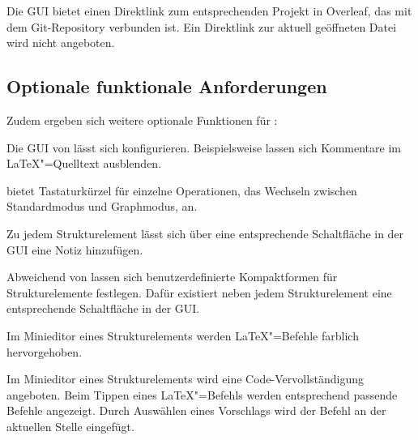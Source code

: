 
Die GUI bietet einen Direktlink zum entsprechenden Projekt in Overleaf, das mit dem Git-Repository verbunden ist.
Ein Direktlink zur aktuell geöffneten Datei wird nicht angeboten.

\clearpage

\subsection{Optionale funktionale Anforderungen}
\label{subsec:optionale-funktionale-anforderungen}

Zudem ergeben sich weitere optionale Funktionen für \texla:


Die GUI von \texla{} lässt sich konfigurieren.
Beispielsweise lassen sich Kommentare im \LaTeX"=Quelltext ausblenden.


\texla{} bietet Tastaturkürzel für einzelne Operationen, \zB{} das Wechseln zwischen Standardmodus und Graphmodus, an.


Zu jedem Strukturelement lässt sich über eine entsprechende Schaltfläche in der GUI eine Notiz hinzufügen.


Abweichend von  lassen sich benutzerdefinierte Kompaktformen für Strukturelemente
festlegen.
Dafür existiert neben jedem Strukturelement eine entsprechende Schaltfläche in der GUI.


Im Minieditor eines Strukturelements werden \LaTeX"=Befehle farblich hervorgehoben.


Im Minieditor eines Strukturelements wird eine Code-Vervollständigung angeboten.
Beim Tippen eines \LaTeX"=Befehls werden entsprechend passende Befehle angezeigt.
Durch Auswählen eines Vorschlags wird der Befehl an der aktuellen Stelle eingefügt.

